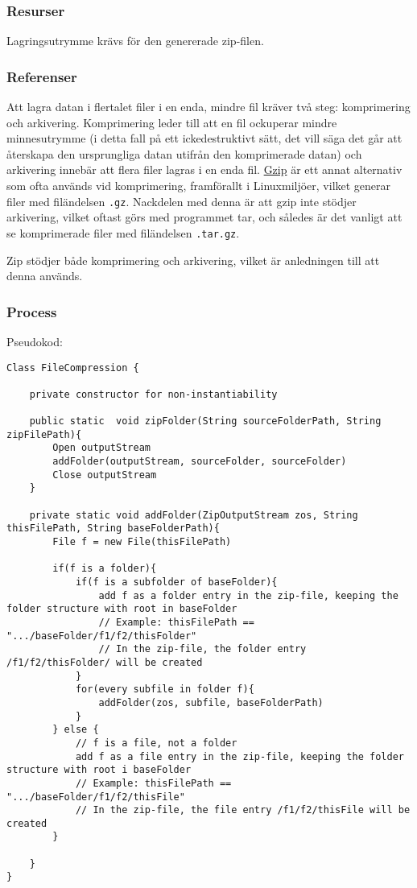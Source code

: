 \subsubsection{Resurser}
Lagringsutrymme krävs för den genererade zip-filen. 

\subsubsection{Referenser}
Att lagra datan i flertalet filer i en enda, mindre fil kräver två steg: komprimering och arkivering. Komprimering leder till att en fil ockuperar mindre minnesutrymme (i detta fall på ett ickedestruktivt sätt, det vill säga det går att återskapa den ursprungliga datan utifrån den komprimerade datan) och arkivering innebär att flera filer lagras i en enda fil. \href{http://en.wikipedia.org/wiki/Gzip}{Gzip} är ett annat alternativ som ofta används vid komprimering, framförallt i Linuxmiljöer, vilket generar filer med filändelsen \verb:.gz:. Nackdelen med denna är att gzip inte stödjer arkivering, vilket oftast görs med programmet tar, och således är det vanligt att se komprimerade filer med filändelsen \verb:.tar.gz:. 

Zip stödjer både komprimering och arkivering, vilket är anledningen till att denna används. 

\subsubsection{Process}
Pseudokod: 
\begin{verbatim}
Class FileCompression {

	private constructor for non-instantiability

	public static  void zipFolder(String sourceFolderPath, String zipFilePath){
		Open outputStream
		addFolder(outputStream, sourceFolder, sourceFolder)
		Close outputStream
	}
	
	private static void addFolder(ZipOutputStream zos, String thisFilePath, String baseFolderPath){
		File f = new File(thisFilePath)
		
		if(f is a folder){
			if(f is a subfolder of baseFolder){
				add f as a folder entry in the zip-file, keeping the folder structure with root in baseFolder
				// Example: thisFilePath == ".../baseFolder/f1/f2/thisFolder"
				// In the zip-file, the folder entry /f1/f2/thisFolder/ will be created
			}
			for(every subfile in folder f){
				addFolder(zos, subfile, baseFolderPath)
			}
		} else {
			// f is a file, not a folder
			add f as a file entry in the zip-file, keeping the folder structure with root i baseFolder
			// Example: thisFilePath == ".../baseFolder/f1/f2/thisFile"
			// In the zip-file, the file entry /f1/f2/thisFile will be created
		}

	}
}
\end{verbatim}

